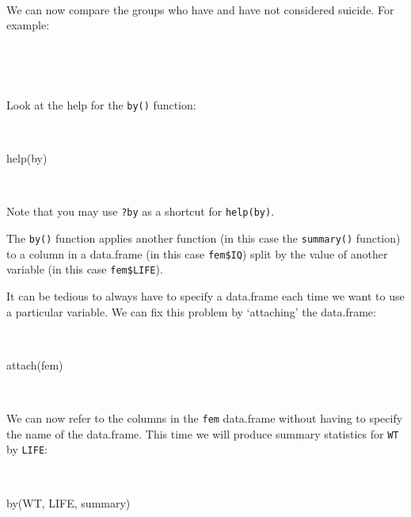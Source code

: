 \documentclass[
  12pt,
]{book}
\newenvironment{Shaded}{\begin{snugshade}}{\end{snugshade}}
\newcommand{\FunctionTok}[1]{\textcolor[rgb]{0.00,0.00,0.00}{#1}}
\newcommand{\NormalTok}[1]{#1}
\newcommand{\SpecialCharTok}[1]{\textcolor[rgb]{0.00,0.00,0.00}{#1}}
\begin{document}
~

We can now compare the groups who have and have not considered suicide. For example:

~

\begin{Shaded}
\end{Shaded}

~

Look at the help for the \texttt{by()} function:

~

\begin{Shaded}
\begin{Highlighting}[]
\FunctionTok{help}\NormalTok{(by)}
\end{Highlighting}
\end{Shaded}

~

Note that you may use \texttt{?by} as a shortcut for \texttt{help(by)}.

The \texttt{by()} function applies another function (in this case the \texttt{summary()} function) to a column in a
data.frame (in this case \texttt{fem\$IQ}) split by the value of another variable (in this case \texttt{fem\$LIFE}).

It can be tedious to always have to specify a data.frame each time we want to use a particular variable. We can
fix this problem by `attaching' the data.frame:

~

\begin{Shaded}
\begin{Highlighting}[]
\FunctionTok{attach}\NormalTok{(fem)}
\end{Highlighting}
\end{Shaded}

~

We can now refer to the columns in the \texttt{fem} data.frame without having to specify the name of the data.frame. This time we will produce summary statistics for \texttt{WT} by \texttt{LIFE}:

~

\begin{Shaded}
\begin{Highlighting}[]
\FunctionTok{by}\NormalTok{(WT, LIFE, summary)}
\end{Highlighting}
\end{Shaded}
\end{document}
